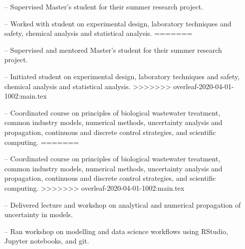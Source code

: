 \documentclass[10pt,a4paper]{altacv}
\begin{document}
\begin{itemize}
<<<<<<< HEAD:cv.tex
    \setlength{\itemindent}{0.3em}
    \item[--]   \small{Supervised Master's student for their summer research project.}
    \item[--]   \small{Worked with student on experimental design, laboratory techniques and safety, chemical analysis and statistical analysis.}
=======
    \setlength{\itemindent}{0.5em}
    \item[--]   \small{Supervised and mentored Master's student for their summer research project.}
    \item[--]   \small{Initiated student on experimental design, laboratory techniques and safety, chemical analysis and statistical analysis.}
>>>>>>> overleaf-2020-04-01-1002:main.tex
\end{itemize}
\divider\smallskip

\begin{itemize}
<<<<<<< HEAD:cv.tex
    \setlength{\itemindent}{0.3em}
    \item[--]   \small{Coordinated course on principles of biological wastewater treatment, 
    common industry models, numerical methods, 
    uncertainty analysis and propagation, 
    continuous and discrete control strategies, 
    and scientific computing.}
=======
    \setlength{\itemindent}{0.5em}
    \item[--]   \small{Coordinated course on principles of biological wastewater treatment, common industry models, numerical methods, uncertainty analysis and propagation, continuous and discrete control strategies, and scientific computing.}
>>>>>>> overleaf-2020-04-01-1002:main.tex
\end{itemize}
\divider\smallskip

\begin{itemize}
    \setlength{\itemindent}{0.3em}
    \item[--]   \small{Delivered lecture and workshop on analytical 
    and numerical propagation of uncertainty in models.}
    \item[--]   \small{Ran workshop on modelling and data science 
    workflows using RStudio, Jupyter notebooks, and git.}
\end{itemize}
\end{document}
